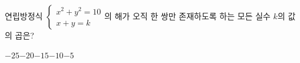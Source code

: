 연립방정식 $\begin{cases} x^2+y^2=10 \\ x+y=k \end{cases}$의 해가 오직 한 쌍만 존재하도록 하는 모든 실수 $k$의 값의 곱은?
\begin{choices32}{$-25$}{$-20$}{$-15$}{$-10$}{$-5$}\end{choices32}
